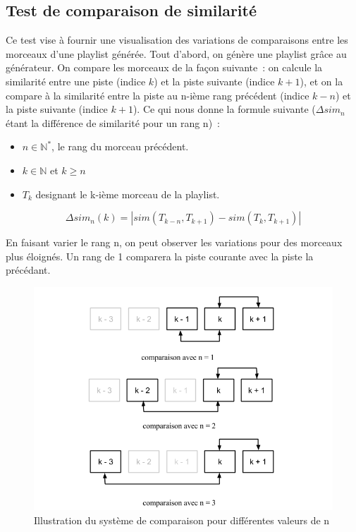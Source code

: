 \subsection{Test de comparaison de similarité}
\label{tests:qualite:comparaison}

Ce test vise à fournir une visualisation des variations de comparaisons entre
les morceaux d'une playlist générée. Tout d'abord, on génère une playlist grâce
au générateur. On compare les morceaux de la façon suivante~: on calcule la
similarité entre une piste (indice $k$) et la piste suivante (indice $k+1$),
et on la compare à la similarité entre la piste au n-ième rang précédent
(indice $k-n$) et la piste suivante (indice $k+1$). Ce qui nous donne la
formule suivante ($\Delta{}sim_{n}$ étant la différence de similarité pour un
rang n)~:

\begin{itemize}
  \item $n \in \mathbb{N}^{*}$, le rang du morceau précédent.
  \item $k \in \mathbb{N}$ et $k \geq n$
  \item $T_{k}$ designant le k-ième morceau de la playlist.
\end{itemize}

\begin{equation*}
  \Delta{}sim_{n}(k) = |sim(T_{k-n}, T_{k+1}) - sim(T_{k}, T_{k+1})|
\end{equation*}

En faisant varier le rang n, on peut observer les variations pour des morceaux
plus éloignés. Un rang de 1 comparera la piste courante avec la piste la
précédant.

\begin{figure}[H]
\includegraphics[width=\textwidth]{data/tests/test-comparaison.png}
\caption{Illustration du système de comparaison pour différentes valeurs de n}
\end{figure}

